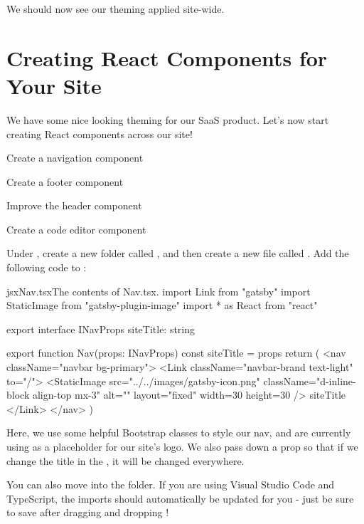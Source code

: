 \documentclass[paper=6in:9in,pagesize=pdftex,headinclude=on,footinclude=on,12pt]{scrbook}
\begin{document}
We should now see our theming applied site-wide.

\section{Creating React Components for Your Site}

We have some nice looking theming for our SaaS product. Let's now start creating React components across our site!

\begin{arrows}
\item Create a navigation component
\item Create a footer component
\item Improve the header component
\item Create a code editor component
\end{arrows}


Under , create a new folder called , and then create a new file called . Add the following code to :

\begin{codeInput}{jsx}{Nav.tsx}{The contents of Nav.tsx.}
import { Link } from "gatsby"
import { StaticImage } from "gatsby-plugin-image"
import * as React from "react"

export interface INavProps {
  siteTitle: string
}

export function Nav(props: INavProps) {
  const { siteTitle } = props
  return (
    <nav className="navbar bg-primary">
      <Link className="navbar-brand text-light" to="/">
        <StaticImage
          src="../../images/gatsby-icon.png"
          className="d-inline-block align-top mx-3"
          alt=""
          layout="fixed"
          width={30}
          height={30}
        />
        {siteTitle}
      </Link>
    </nav>
  )
}  
\end{codeInput}

Here, we use some helpful Bootstrap classes to style our nav, and are currently using  as a placeholder for our site's logo. We also pass down a  prop so that if we change the title in the , it will be changed everywhere.

You can also move  into the  folder. If you are using Visual Studio Code and TypeScript, the imports should automatically be updated for you - just be sure to save after dragging and dropping !
\end{document}
